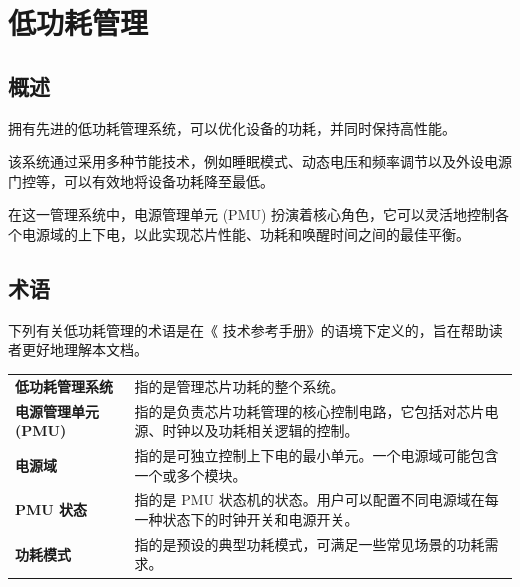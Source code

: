 \documentclass[main\_\_CN.tex]{subfiles}
\begin{document}

\ifglobal
\else
    \listoftodos
    {\let\clearpage\relax \listofdonetodos}
    \tableofcontents
\fi




\hypertarget{lowpowm}{}
\chapter{低功耗管理}\label{mod:lowpowm}

\section{概述}

\chipname{} 拥有先进的低功耗管理系统，可以优化设备的功耗，并同时保持高性能。

该系统通过采用多种节能技术，例如睡眠模式、动态电压和频率调节以及外设电源门控等，可以有效地将设备功耗降至最低。

在这一管理系统中，电源管理单元 (PMU) 扮演着核心角色，它可以灵活地控制各个电源域的上下电，以此实现芯片性能、功耗和唤醒时间之间的最佳平衡。

\section{术语}

下列有关低功耗管理的术语是在《\chipname{} 技术参考手册》的语境下定义的，旨在帮助读者更好地理解本文档。

\begin{longtable}[c]{ R{4cm} p{12cm} }
\textbf{低功耗管理系统} & 指的是管理芯片功耗的整个系统。\\
\textbf{电源管理单元 (PMU)} & 指的是负责芯片功耗管理的核心控制电路，它包括对芯片电源、时钟以及功耗相关逻辑的控制。\\
\textbf{电源域} & 指的是可独立控制上下电的最小单元。一个电源域可能包含一个或多个模块。 \\
\textbf{PMU 状态} & 指的是 PMU 状态机的状态。用户可以配置不同电源域在每一种状态下的时钟开关和电源开关。\\
\textbf{功耗模式} & 指的是预设的典型功耗模式，可满足一些常见场景的功耗需求。\\
\end{longtable}
\end{document}
